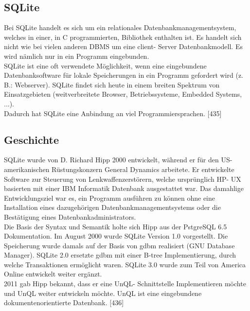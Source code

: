 \documentclass[12pt,a4paper]{report}
\begin{document}
\begin{onehalfspace}
\section{SQLite}
Bei SQLite handelt es sich um ein relationales Datenbankmanagementsystem, welches in einer, in C programmierten, Bibliothek enthalten ist. Es handelt sich nicht wie bei vielen anderen DBMS um eine client- Server Datenbankmodell. Es wird nämlich nur in ein Programm eingebunden.\\

SQLite ist eine oft verwendete Möglichkeit, wenn eine eingebundene Datenbanksoftware für lokale Speicherungen in ein Programm gefordert wird (z. B.: Webserver). SQLite findet sich heute in einem breiten Spektrum von Einsatzgebieten (weitverbreitete Browser, Betriebssysteme, Embedded Systems, ...).\\
Dadurch hat SQLite eine Anbindung an viel Programmiersprachen. [435]

\subsection{Geschichte}
SQLite wurde von D. Richard Hipp 2000 entwickelt, während er für den US- amerikanischen Rüstungskonzern General Dynamics arbeitete. Er entwickelte Software zur Steuerung von Lenkwaffenzerstörern, welche ursprünglich HP- UX basierten mit einer IBM Informatik Datenbank ausgestattet war. Das damahlige Entwicklungsziel war es, ein Programm ausführen zu können ohne eine Installation eines dazugehörigen Datenbankmanagementsystems oder die Bestätigung eines Datenbankadministrators.\\

Die Basis der Syntax und Semantik holte sich Hipp aus der PstgreSQL 6.5 Dokumentation. Im August 2000 wurde SQLite Version 1.0 vorgestellt. Die Speicherung wurde damals auf der Basis von gdbm realisiert (GNU Database Manager). SQLite 2.0 ersetzte gdbm mit einer B-tree Implementierung, durch welche Transaktionen ermöglicht waren. SQLite 3.0 wurde zum Teil von America Online entwickelt weiter ergänzt. \\

2011 gab Hipp bekannt, dass er eine UnQL- Schnittstelle Implementieren möchte und UnQL weiter entwickeln möchte. UnQL ist eine eingebundene dokumentenorientierte Datenbank. [436]


\end{onehalfspace}
\end{document}
